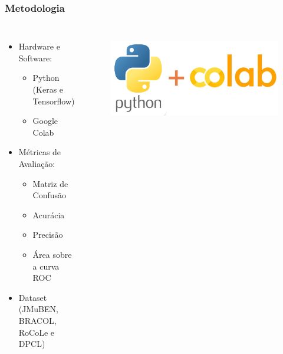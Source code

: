 \documentclass[aspectratio=169]{beamer}
\begin{document}
\begin{frame}
    \frametitle{Metodologia}
    \begin{columns}


        \begin{itemize}
            \item Hardware e Software:
                  \begin{itemize}
                      \item Python (Keras e Tensorflow)
                      \item Google Colab
                  \end{itemize}
            \item Métricas de Avaliação:
                  \begin{itemize}
                      \item Matriz de Confusão
                      \item Acurácia
                      \item Precisão
                      \item Área sobre a curva ROC
                  \end{itemize}
            \item Dataset (JMuBEN, BRACOL, RoCoLe e DPCL)
        \end{itemize}


        \begin{figure}
            \centering
            \includegraphics[scale = 0.2]{img/python_colab.png}
            \label{fig:enter-label}
        \end{figure}

    \end{columns}
\end{frame}
\end{document}
